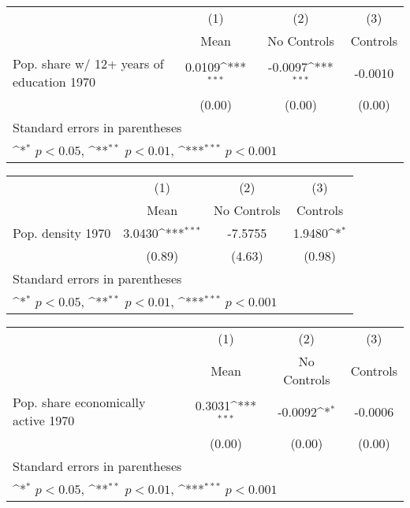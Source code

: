 {
\def\sym#1{\ifmmode^{#1}\else\(^{#1}\)\fi}
\begin{tabular}{l*{3}{c}}
\hline\hline
                    &\multicolumn{1}{c}{(1)}&\multicolumn{1}{c}{(2)}&\multicolumn{1}{c}{(3)}\\
                    &\multicolumn{1}{c}{Mean}&\multicolumn{1}{c}{No Controls}&\multicolumn{1}{c}{Controls}\\
\hline
Pop. share w/ 12+ years of education 1970&      0.0109\sym{***}&     -0.0097\sym{***}&     -0.0010         \\
                    &      (0.00)         &      (0.00)         &      (0.00)         \\
\hline\hline
\multicolumn{4}{l}{\footnotesize Standard errors in parentheses}\\
\multicolumn{4}{l}{\footnotesize \sym{*} \(p<0.05\), \sym{**} \(p<0.01\), \sym{***} \(p<0.001\)}\\
\end{tabular}
}
{
\def\sym#1{\ifmmode^{#1}\else\(^{#1}\)\fi}
\begin{tabular}{l*{3}{c}}
\hline\hline
                    &\multicolumn{1}{c}{(1)}&\multicolumn{1}{c}{(2)}&\multicolumn{1}{c}{(3)}\\
                    &\multicolumn{1}{c}{Mean}&\multicolumn{1}{c}{No Controls}&\multicolumn{1}{c}{Controls}\\
\hline
Pop. density 1970   &      3.0430\sym{***}&     -7.5755         &      1.9480\sym{*}  \\
                    &      (0.89)         &      (4.63)         &      (0.98)         \\
\hline\hline
\multicolumn{4}{l}{\footnotesize Standard errors in parentheses}\\
\multicolumn{4}{l}{\footnotesize \sym{*} \(p<0.05\), \sym{**} \(p<0.01\), \sym{***} \(p<0.001\)}\\
\end{tabular}
}
{
\def\sym#1{\ifmmode^{#1}\else\(^{#1}\)\fi}
\begin{tabular}{l*{3}{c}}
\hline\hline
                    &\multicolumn{1}{c}{(1)}&\multicolumn{1}{c}{(2)}&\multicolumn{1}{c}{(3)}\\
                    &\multicolumn{1}{c}{Mean}&\multicolumn{1}{c}{No Controls}&\multicolumn{1}{c}{Controls}\\
\hline
Pop. share economically active 1970&      0.3031\sym{***}&     -0.0092\sym{*}  &     -0.0006         \\
                    &      (0.00)         &      (0.00)         &      (0.00)         \\
\hline\hline
\multicolumn{4}{l}{\footnotesize Standard errors in parentheses}\\
\multicolumn{4}{l}{\footnotesize \sym{*} \(p<0.05\), \sym{**} \(p<0.01\), \sym{***} \(p<0.001\)}\\
\end{tabular}
}
